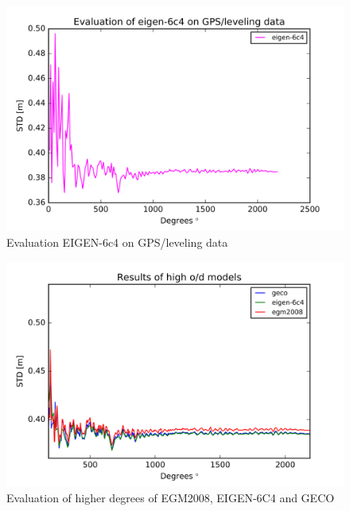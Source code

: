        \begin{figure}[t]
        	\caption{Evaluation EIGEN-6c4 on GPS/leveling data}
        	\label{sudan_data}
        	\includegraphics{Figures/eigen-6c4_gps_figure.png}
        	\centering
        \end{figure}
        
        \begin{figure}[t]
              	\caption{Evaluation of higher degrees of EGM2008, EIGEN-6C4 and GECO}
              	\label{sudan_data}
              	\includegraphics{Figures/high_order_results.png}
              	\centering
        \end{figure}
        
